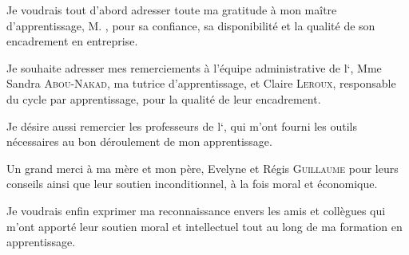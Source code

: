 Je voudrais tout d’abord adresser toute ma gratitude à mon maître d'apprentissage, M. \damien, pour sa confiance, sa disponibilité et la qualité de son encadrement en entreprise.

Je souhaite adresser mes remerciements à l'équipe administrative de l‘\epita, Mme Sandra \textsc{Abou-Nakad}, ma tutrice d'apprentissage, et Claire \textsc{Leroux}, responsable du cycle par apprentissage, pour la qualité de leur encadrement.

Je désire aussi remercier les professeurs de l‘\epita, qui m’ont fourni les outils nécessaires au bon déroulement de mon apprentissage.

Un grand merci à ma mère et mon père, Evelyne et Régis \textsc{Guillaume} pour leurs conseils ainsi que leur soutien inconditionnel, à la fois moral et économique.

Je voudrais enfin exprimer ma reconnaissance envers les amis et collègues qui m’ont apporté leur soutien moral et intellectuel tout au long de ma formation en apprentissage.